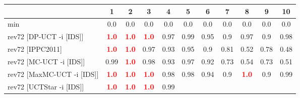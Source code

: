 \documentclass{article}
\begin{document}
\begin{tabular}{|l|r@{$\pm$}rr@{$\pm$}rr@{$\pm$}rr@{$\pm$}rr@{$\pm$}rr@{$\pm$}rr@{$\pm$}rr@{$\pm$}rr@{$\pm$}rr@{$\pm$}r|}
\hline

& \multicolumn{2}{c}{1}
& \multicolumn{2}{c}{2}
& \multicolumn{2}{c}{3}
& \multicolumn{2}{c}{4}
& \multicolumn{2}{c}{5}
& \multicolumn{2}{c}{6}
& \multicolumn{2}{c}{7}
& \multicolumn{2}{c}{8}
& \multicolumn{2}{c}{9}
& \multicolumn{2}{c|}{10}
\\
\hline
\hline
min
& \multicolumn{2}{c}{0.0}
& \multicolumn{2}{c}{0.0}
& \multicolumn{2}{c}{0.0}
& \multicolumn{2}{c}{0.0}
& \multicolumn{2}{c}{0.0}
& \multicolumn{2}{c}{0.0}
& \multicolumn{2}{c}{0.0}
& \multicolumn{2}{c}{0.0}
& \multicolumn{2}{c}{0.0}
& \multicolumn{2}{c|}{0.0}
\\
rev72 [DP-UCT -i [IDS]]
& \multicolumn{2}{c}{\textbf{\textcolor{red}{1.0}}}
& \multicolumn{2}{c}{\textbf{\textcolor{red}{1.0}}}
& \multicolumn{2}{c}{\textbf{\textcolor{red}{1.0}}}
& \multicolumn{2}{c}{0.97}
& \multicolumn{2}{c}{0.99}
& \multicolumn{2}{c}{0.95}
& \multicolumn{2}{c}{0.9}
& \multicolumn{2}{c}{0.97}
& \multicolumn{2}{c}{0.9}
& \multicolumn{2}{c|}{0.98}
\\
rev72 [IPPC2011]
& \multicolumn{2}{c}{\textbf{\textcolor{red}{1.0}}}
& \multicolumn{2}{c}{\textbf{\textcolor{red}{1.0}}}
& \multicolumn{2}{c}{0.97}
& \multicolumn{2}{c}{0.93}
& \multicolumn{2}{c}{0.95}
& \multicolumn{2}{c}{0.9}
& \multicolumn{2}{c}{0.81}
& \multicolumn{2}{c}{0.52}
& \multicolumn{2}{c}{0.78}
& \multicolumn{2}{c|}{0.48}
\\
rev72 [MC-UCT -i [IDS]]
& \multicolumn{2}{c}{0.99}
& \multicolumn{2}{c}{\textbf{\textcolor{red}{1.0}}}
& \multicolumn{2}{c}{0.98}
& \multicolumn{2}{c}{0.93}
& \multicolumn{2}{c}{0.97}
& \multicolumn{2}{c}{0.92}
& \multicolumn{2}{c}{0.73}
& \multicolumn{2}{c}{0.54}
& \multicolumn{2}{c}{0.73}
& \multicolumn{2}{c|}{0.51}
\\
rev72 [MaxMC-UCT -i [IDS]]
& \multicolumn{2}{c}{\textbf{\textcolor{red}{1.0}}}
& \multicolumn{2}{c}{\textbf{\textcolor{red}{1.0}}}
& \multicolumn{2}{c}{\textbf{\textcolor{red}{1.0}}}
& \multicolumn{2}{c}{0.98}
& \multicolumn{2}{c}{0.98}
& \multicolumn{2}{c}{0.94}
& \multicolumn{2}{c}{0.9}
& \multicolumn{2}{c}{\textbf{\textcolor{red}{1.0}}}
& \multicolumn{2}{c}{0.9}
& \multicolumn{2}{c|}{0.99}
\\
rev72 [UCTStar -i [IDS]]
& \multicolumn{2}{c}{\textbf{\textcolor{red}{1.0}}}
& \multicolumn{2}{c}{\textbf{\textcolor{red}{1.0}}}
& \multicolumn{2}{c}{\textbf{\textcolor{red}{1.0}}}
& \multicolumn{2}{c}{0.99}

\end{tabular}
\end{document}

